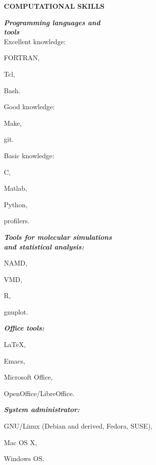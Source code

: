\documentclass[a4paper,10pt,final]{memoir}
\newcommand{\Sep}{\vspace{1.5em}}
\newcommand{\SmallSep}{\vspace{0.5em}}
\newcommand{\CVSection}[1]
	{\Large\textbf{#1}\par
	\SmallSep\normalsize\normalfont}
\newcommand{\CVItem}[2]
	{\textit{\textbf{\color{RoyalBlue} #1}} #2}
\begin{document}
\Sep
\CVSection{COMPUTATIONAL SKILLS}
\begin{multicols}{3}
\CVItem{
Programming languages and \\
tools\hfill
} \\
Excellent knowledge:
\begin{compactitem}[\color{RoyalBlue}$\circ$]
\item FORTRAN,
\item Tcl,
\item Bash.
\end{compactitem}
Good knowledge:
\begin{compactitem}[\color{RoyalBlue}$\circ$]
\item Make,
\item git.
\end{compactitem}
Basic knowledge:
\begin{compactitem}[\color{RoyalBlue}$\circ$]
\item C,
\item Matlab,
\item Python,
\item profilers.
\end{compactitem}
\SmallSep
 
\CVItem{Tools for molecular simulations\\ and statistical analysis:\hfill}
\begin{compactitem}[\color{RoyalBlue}$\circ$]
\item NAMD,
\item VMD,
\item R,
\item gnuplot.
\end{compactitem}
\SmallSep

\CVItem{Office tools:\hfill}
\begin{compactitem}[\color{RoyalBlue}$\circ$]
\item LaTeX,
\item Emacs,
\item Microsoft Office,
\item OpenOffice/LibreOffice. 
\end{compactitem}
\SmallSep

\CVItem{System administrator:\hfill}
\begin{compactitem}[\color{RoyalBlue}$\circ$]
\item GNU/Linux (Debian and derived, Fedora, SUSE),
\item Mac OS X,
\item Windows OS.
\end{compactitem}
\SmallSep


\end{multicols}
\end{document}
